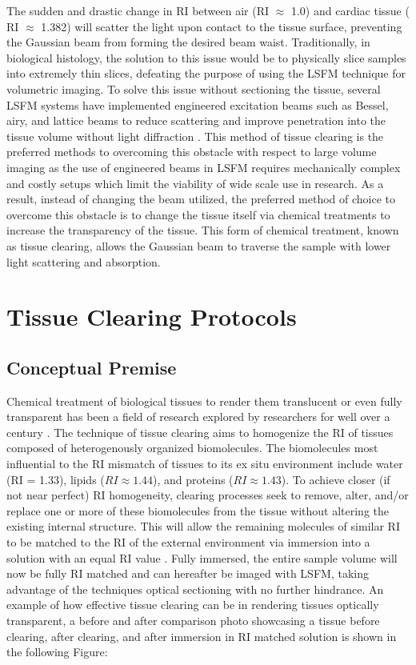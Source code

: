 The sudden and drastic change in RI between air (RI $\approx$ 1.0) and cardiac tissue ( RI $\approx$ 1.382) will scatter the light upon contact to the tissue surface, preventing the Gaussian beam from forming the desired beam waist. Traditionally, in biological histology, the solution to this issue would be to physically slice samples into extremely thin slices, defeating the purpose of using the LSFM technique for volumetric imaging. To solve this issue without sectioning the tissue, several LSFM systems have implemented engineered excitation beams such as Bessel, airy, and lattice beams to reduce scattering and improve penetration into the tissue volume without light diffraction \cite{sapoznik_single-objective_2020, poola_light_2019}. This method of tissue clearing is the preferred methods to overcoming this obstacle with respect to large volume imaging as the use of engineered beams in LSFM requires mechanically complex and costly setups which limit the viability of wide scale use in research. As a result, instead of changing the beam utilized, the preferred method of choice to overcome this obstacle is to change the tissue itself via chemical treatments to increase the transparency of the tissue. This form of chemical treatment, known as tissue clearing, allows the Gaussian beam to traverse the sample with lower light scattering and absorption. 


\section{Tissue Clearing Protocols}
\subsection{Conceptual Premise}
Chemical treatment of biological tissues to render them translucent or even fully transparent has been a field of research explored by researchers for well over a century \cite{paysan_art_2023}. The technique of tissue clearing aims to homogenize the RI of tissues composed of heterogenously organized biomolecules. The biomolecules most influential to the RI mismatch of tissues to its ex situ environment include water (RI = 1.33), lipids ($RI \approx 1.44$), and proteins ($RI \approx 1.43$). To achieve closer (if not near perfect) RI homogeneity, clearing processes seek to remove, alter, and/or replace one or more of these biomolecules from the tissue without altering the existing internal structure. This will allow the remaining molecules of similar RI to be matched to the RI of the external environment via immersion into a solution with an equal RI value \cite{paysan_art_2023, tainaka_chemical_2018}. Fully immersed, the entire sample volume will now be fully RI matched and can hereafter be imaged with LSFM, taking advantage of the techniques optical sectioning with no further hindrance. An example of how effective tissue clearing can be in rendering tissues optically transparent, a before and after comparison photo showcasing a tissue before clearing, after clearing, and after immersion in RI matched solution is shown in the following Figure:

